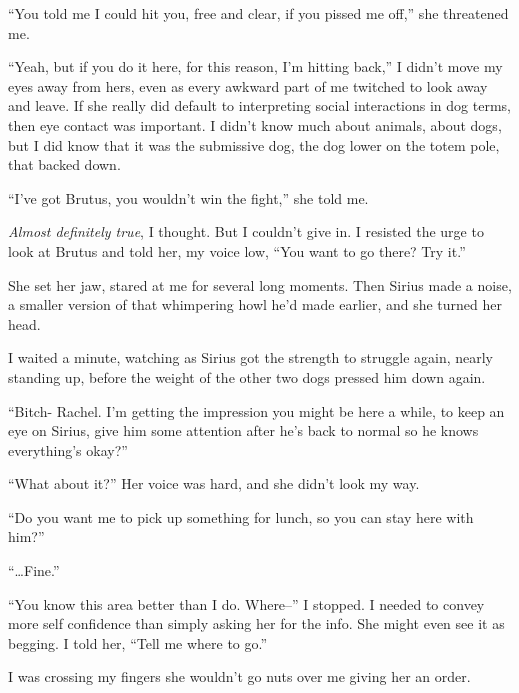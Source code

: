 ``You told me I could hit you, free and clear, if you pissed me off,'' she threatened me.



``Yeah, but if you do it here, for this reason, I'm hitting back,'' I didn't move my eyes away from hers, even as every awkward part of me twitched to look away and leave.  If she really did default to interpreting social interactions in dog terms, then eye contact was important.  I didn't know much about animals, about dogs, but I did know that it was the submissive dog, the dog lower on the totem pole, that backed down.



``I've got Brutus, you wouldn't win the fight,'' she told me.



\emph{Almost definitely true}, I thought.  But I couldn't give in.  I resisted the urge to look at Brutus and told her, my voice low, ``You want to go there?  Try it.''



She set her jaw, stared at me for several long moments.  Then Sirius made a noise, a smaller version of that whimpering howl he'd made earlier, and she turned her head.



I waited a minute, watching as Sirius got the strength to struggle again, nearly standing up, before the weight of the other two dogs pressed him down again.



``Bitch- Rachel.  I'm getting the impression you might be here a while, to keep an eye on Sirius, give him some attention after he's back to normal so he knows everything's okay?''



``What about it?''  Her voice was hard, and she didn't look my way.



``Do you want me to pick up something for lunch, so you can stay here with him?''



``\ldots{}Fine.''



``You know this area better than I do.  Where--'' I stopped.  I needed to convey more self confidence than simply asking her for the info.  She might even see it as begging.  I told her, ``Tell me where to go.''



I was crossing my fingers she wouldn't go nuts over me giving her an order.



